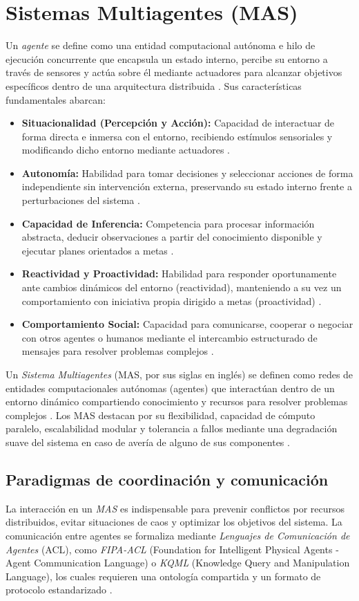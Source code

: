 \documentclass[12pt, letterpaper, oneside]{book}
\begin{document}
\section{Sistemas Multiagentes (MAS)}
Un \textit{agente} se define como una entidad computacional autónoma e hilo de ejecución concurrente que encapsula un estado interno, percibe su entorno a través de sensores y actúa sobre él mediante actuadores para alcanzar objetivos específicos dentro de una arquitectura distribuida \cite{InnMAS2010}. Sus características fundamentales abarcan: \begin{itemize} \item \textbf{Situacionalidad (Percepción y Acción):} Capacidad de interactuar de forma directa e inmersa con el entorno, recibiendo estímulos sensoriales y modificando dicho entorno mediante actuadores \cite{InnMAS2010}. \item \textbf{Autonomía:} Habilidad para tomar decisiones y seleccionar acciones de forma independiente sin intervención externa, preservando su estado interno frente a perturbaciones del sistema \cite{InnMAS2010}. \item \textbf{Capacidad de Inferencia:} Competencia para procesar información abstracta, deducir observaciones a partir del conocimiento disponible y ejecutar planes orientados a metas \cite{InnMAS2010}. \item \textbf{Reactividad y Proactividad:} Habilidad para responder oportunamente ante cambios dinámicos del entorno (reactividad), manteniendo a su vez un comportamiento con iniciativa propia dirigido a metas (proactividad) \cite{InnMAS2010}. \item \textbf{Comportamiento Social:} Capacidad para comunicarse, cooperar o negociar con otros agentes o humanos mediante el intercambio estructurado de mensajes para resolver problemas complejos \cite{InnMAS2010}. \end{itemize}
Un \textit{Sistema Multiagentes} (MAS, por sus siglas en inglés) se definen como redes de entidades computacionales autónomas (agentes) que interactúan dentro de un entorno dinámico compartiendo conocimiento y recursos para resolver problemas complejos \cite{InnMAS2010}. Los MAS destacan por su flexibilidad, capacidad de cómputo paralelo, escalabilidad modular y tolerancia a fallos mediante una degradación suave del sistema en caso de avería de alguno de sus componentes \cite{InnMAS2010}.

\subsection{Paradigmas de coordinación y comunicación}
La interacción en un \textit{MAS} es indispensable para prevenir conflictos por recursos distribuidos, evitar situaciones de caos y optimizar los objetivos del sistema. La comunicación entre agentes se formaliza mediante \textit{Lenguajes de Comunicación de Agentes} (ACL), como \textit{FIPA-ACL} (Foundation for Intelligent Physical Agents - Agent Communication Language) o \textit{KQML} (Knowledge Query and Manipulation Language), los cuales requieren una ontología compartida y un formato de protocolo estandarizado \cite{InnMAS2010}.
\end{document}
